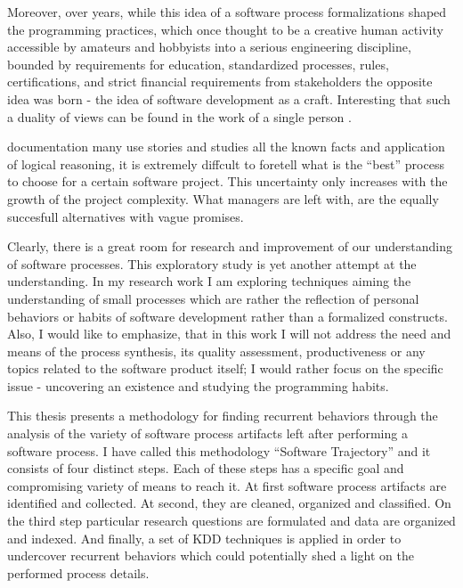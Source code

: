 Moreover, over years, while this idea of a software process formalizations shaped the 
programming practices, which once thought to be a creative human activity accessible by amateurs 
and hobbyists \cite{citeulike:9958822} into a serious engineering discipline, bounded 
by requirements for education, standardized processes, rules, certifications, and strict 
financial requirements from stakeholders the opposite idea was born - the idea of 
software development as a craft. Interesting that such a duality of views can be found 
in the work of a single person \cite{citeulike:5203446}.

 documentation many 
use stories and studies all the known facts and application of logical 
reasoning, it is extremely diffcult to foretell what is the ``best'' process to choose for a 
certain software project. This uncertainty only increases with the growth of the project complexity.
What managers are left with, are the equally succesfull alternatives with vague promises. 

Clearly, there is a great room for research and improvement of our understanding of software processes.
This exploratory study is yet another attempt at the understanding. In my research work I am 
exploring techniques aiming the understanding of small processes which are 
rather the reflection of personal behaviors or habits of software development rather than a 
formalized constructs. Also, I would like to emphasize, that in this work I will not 
address the need and means of the process synthesis, its quality assessment, productiveness
or any topics related to the software product itself; I would rather focus on the specific issue - 
uncovering an existence and studying the programming habits. 

This thesis presents a methodology for finding recurrent behaviors through the 
analysis of the variety of software process artifacts left after performing a 
software process. I have called this methodology ``Software Trajectory'' and it consists 
of four distinct steps. Each of these steps has a specific goal and compromising variety of 
means to reach it. 
At first software process artifacts are identified and collected. 
At second, they are cleaned, organized and classified. 
On the third step particular research questions are formulated and data are organized and indexed. 
And finally, a set of KDD techniques is applied in order to undercover recurrent behaviors which 
could potentially shed a light on the performed process details. 

